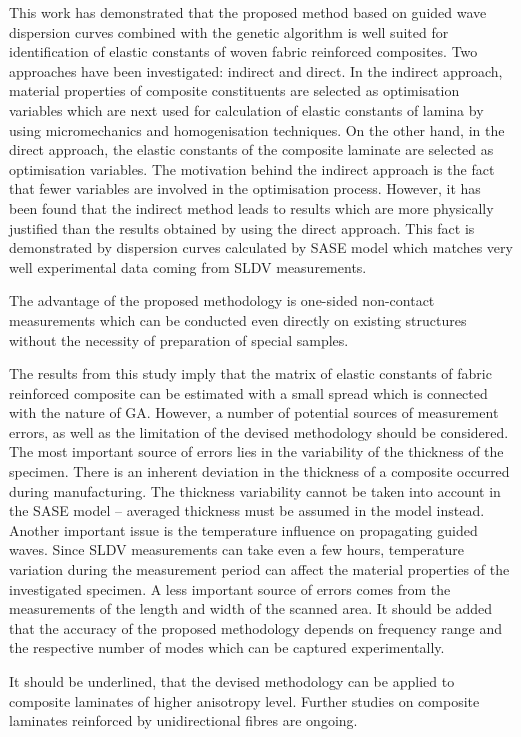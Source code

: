 \documentclass[preprint,12pt]{elsarticle}
\begin{document}
	This work has demonstrated that the proposed method based on guided wave dispersion curves combined with the genetic algorithm is well suited for identification of elastic constants of woven fabric reinforced composites. Two approaches have been investigated: indirect and direct.  In the indirect approach, material properties of composite constituents are selected as optimisation variables which are next used for calculation of elastic constants of lamina by using micromechanics and homogenisation techniques. On the other hand, in the direct approach, the elastic constants of the composite laminate are selected as optimisation variables. The motivation behind the indirect approach is the fact that fewer variables are involved in the optimisation process. However, it has been found that the indirect method leads to results which are more physically justified than the results obtained by using the direct approach. This fact is demonstrated by dispersion curves calculated by SASE model which matches very well experimental data coming from SLDV measurements. 
	
	The advantage of the proposed methodology is one-sided non-contact measurements which can be conducted even directly on existing structures without the necessity of preparation of special samples.
	
	The results from this study imply that the matrix of elastic constants of fabric reinforced composite can be estimated with a small spread which is connected with the nature of GA. However, a number of potential sources of measurement errors, as well as the limitation of the devised methodology should be considered. The most important source of errors lies in the variability of the thickness of the specimen. There is an inherent deviation in the thickness of a composite occurred during manufacturing. The thickness variability cannot be taken into account in the SASE model -- averaged thickness must be assumed in the model instead. Another important issue is the temperature influence on propagating guided waves. Since SLDV measurements can take even a few hours, temperature variation during the measurement period can affect the material properties of the investigated specimen. A less important source of errors comes from the measurements of the length and width of the scanned area. It should be added that the accuracy of the proposed methodology depends on frequency range and the respective number of modes which can be captured experimentally.
	
	It should be underlined, that the devised methodology can be applied to composite laminates of higher anisotropy level. Further studies on composite laminates reinforced by unidirectional fibres are ongoing.
	 
\end{document}
